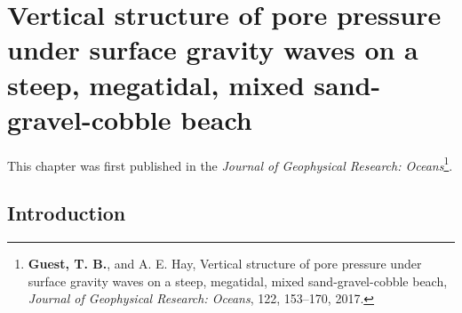 \chapter{Vertical structure of pore pressure under surface gravity waves on a steep, megatidal, mixed sand-gravel-cobble beach}\label{Chapter:PorePressure}


%
%	
%

This chapter was first published in the \textit{Journal of Geophysical Research: Oceans}\footnote{\textbf{Guest, T. B.}, and A. E. Hay, Vertical structure of pore pressure under surface gravity waves on a steep, megatidal, mixed sand-gravel-cobble beach, \textit{Journal of Geophysical Research: Oceans}, 122, 153–170, 2017.}.

\section{Introduction}\label{ch1:Introduction}

